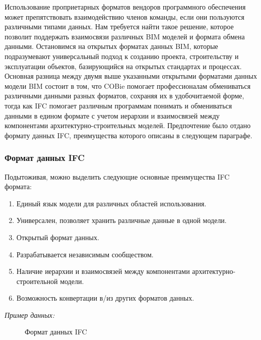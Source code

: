 \documentclass[a4paper,14pt]{extreport} %
\begin{document}
Использование проприетарных форматов вендоров программного обеспечения может препятствовать взаимодействию членов команды, если они пользуются различными типами данных. Нам требуется найти такое решение, которое позволит поддержать взаимосвязи различных BIM моделей и формата обмена данными. Остановимся на открытых форматах данных BIM, которые подразумевают универсальный подход к созданию проекта, строительству и эксплуатации объектов, базирующийся на открытых стандартах и процессах. \\
Основная разница между двумя выше указанными открытыми форматами данных модели BIM состоит в том, что COBie помогает профессионалам обмениваться различными данными разных форматов, сохраняя их в удобочитаемой форме, тогда как IFC помогает различным программам понимать и обмениваться данными в едином формате с учетом иерархии и взаимосвязей между компонентами архитектурно-строительных моделей. Предпочтение было отдано формату данных IFC, преимущества которого описаны в следующем параграфе.\\

\subsubsection{Формат данных IFC}

Подытоживая, можно выделить следующие основные преимущества IFC формата:
\begin{enumerate}
\item Единый язык модели для различных областей использования.
\item Универсален, позволяет хранить различные данные в одной модели.
\item Открытый формат данных.
\item Разрабатывается независимым сообществом.
\item Наличие иерархии и взаимосвязей между компонентами архитектурно-строительной модели.
\item Возможность конвертации в/из других форматов данных.
\end{enumerate} 

\textit{Пример данных:}
\begin{figure}[H]
\caption{Формат данных IFC}
\label{ifc-data-format}
\end{figure}
\end{document}
